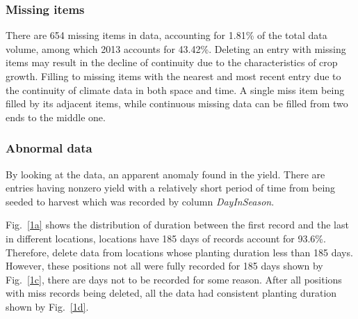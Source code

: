 \documentclass[conference, a4paper]{IEEEtran}
\begin{document}
    \subsubsection{Missing items}
      There are 654 missing items in data, accounting for 1.81\% of the total data volume, among which 2013 accounts for 43.42\%. Deleting an entry with missing items may result in the decline of continuity due to the characteristics of crop growth. Filling to missing items with the nearest and most recent entry due to the continuity of climate data in both space and time. A single miss item being filled by its adjacent items, while continuous missing data can be filled from two ends to the middle one.

    \subsubsection{Abnormal data}
      By looking at the data, an apparent anomaly found in the yield. There are entries having nonzero yield with a relatively short period of time from being seeded to harvest which was recorded by column \textit{DayInSeason}.  

      Fig.~\ref{1a} shows the distribution of duration between the first record and the last in different locations, locations have 185 days of records account for 93.6\%. Therefore, delete data from locations whose planting duration less than 185 days. However, these positions not all were fully recorded for 185 days shown by Fig.~\ref{1c}, there are days not to be recorded for some reason. After all positions with miss records being deleted, all the data had consistent planting duration shown by Fig.~\ref{1d}.
\end{document}
